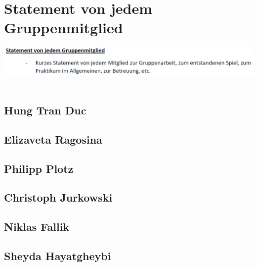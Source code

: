 \documentclass[a4paper, 11pt]{article} %
\begin{document}
\section{Statement von jedem Gruppenmitglied}
\includegraphics[scale=0.5]{images/statement.png}\\\\
\subsection{Hung Tran Duc}
\subsection{Elizaveta Ragosina}
\subsection{Philipp Plotz}
\subsection{Christoph Jurkowski}
\subsection{Niklas Fallik}
\subsection{Sheyda Hayatgheybi}

\end{document}
